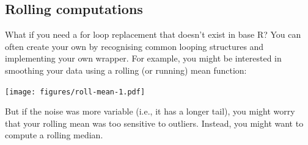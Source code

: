 \subsection{Rolling computations}

What if you need a for loop replacement that doesn't exist in base R?
You can often create your own by recognising common looping structures
and implementing your own wrapper. For example, you might be interested
in smoothing your data using a rolling (or running) mean function:

\begin{Shaded}
\begin{Highlighting}[]
\StringTok{ }
  \StringTok{ }\NormalTok{(}\NormalTok{, }

  \StringTok{ }\StringTok{ }\NormalTok{)}
  \StringTok{ }\NormalTok{):(}\StringTok{ }\StringTok{ }\StringTok{ }\NormalTok{)) \{}
    \StringTok{ }\NormalTok{(x[(i -}\StringTok{ }\StringTok{ }\StringTok{ }\NormalTok{)])}
  \NormalTok{\}}
\NormalTok{\}}
\StringTok{ }\NormalTok{(}\NormalTok{, }\NormalTok{, } \NormalTok{) +}\StringTok{ }\NormalTok{(}\NormalTok{)}
\NormalTok{(}\NormalTok{), } \NormalTok{, } \NormalTok{)}
\NormalTok{(}\NormalTok{), } \NormalTok{, } \NormalTok{)}
\end{Highlighting}
\end{Shaded}

\texttt{[image: figures/roll-mean-1.pdf]}

But if the noise was more variable (i.e., it has a longer tail), you
might worry that your rolling mean was too sensitive to outliers.
Instead, you might want to compute a rolling median.

